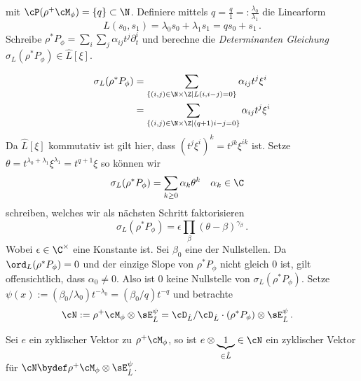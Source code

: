 mit $\cP(\rho^+\cM_\phi)=\{q\}\subset\N$. Definiere mittels
$q=\frac{q}{1}=:\frac{\lambda_0}{\lambda_1}$ die  Linearform
\[
L(s_0,s_1)=\lambda_0s_0+\lambda_1s_1=qs_0+s_1 \,.
\]
Schreibe $\rho^*P_{\phi}=\sum_i\sum_j\alpha_{ij}t^j\partial_t^i$ und berechne
die \emph{Determinanten Gleichung} $\sigma_L(\rho^*P_{\phi})\in \hat L[\xi]$.
\begin{comment}
Schon gezeigt, das $ord_L = 0$?
\end{comment}
\begin{align*}
\sigma_L(\rho^*P_{\phi})
  &= \sum_{\{(i,j)\in\N\times\Z \mid L(i,i-j)=0\}}\alpha_{ij}t^j\xi^i\\
  &= \sum_{\{(i,j)\in\N\times\Z \mid (q+1)i-j=0\}}\alpha_{ij}t^j\xi^i
\end{align*}
Da $\hat L[\xi]$ kommutativ ist gilt hier, dass $(t^j\xi^i)^k=t^{jk}\xi^{ik}$ ist.
Setze $\theta=t^{\lambda_0+\lambda_1}\xi^{\lambda_1}=t^{q+1}\xi$ so können wir
\begin{align*}
\sigma_L(\rho^*P_{\phi}) &= \sum_{k\geq 0}\alpha_k\theta^k & & \alpha_k\in\C
\end{align*}
schreiben, welches wir als nächsten Schritt faktorisieren
\[
\sigma_L(\rho^*P_\phi)=\epsilon\prod_{\beta}(\theta-\beta)^{\gamma_\beta}\,.
\]
Wobei $\epsilon\in\C^\times$ eine Konstante ist.
Sei $\beta_0$  eine der Nullstellen.
Da $\ord_L(\rho^*P_\phi)=0$ und der einzige Slope von $\rho^*P_\phi$ nicht
gleich $0$ ist, gilt offensichtlich, dass $\alpha_0\neq0$. Also ist $0$ keine
Nullstelle von $\sigma_L(\rho^*P_\phi)$.
Setze $\psi(x):=(\beta_0/\lambda_0)t^{-\lambda_0}=(\beta_0/q)t^{-q}$ und
betrachte
\begin{align*}
\cN:=\rho^+\cM_\phi\otimes\sE_{\hat L}^\psi
  &= \cD_{\hat L}/\cD_{\hat L}\cdot(\rho^*P_{\phi})\otimes\sE_{\hat L}^\psi \,.
\end{align*}
\begin{lem}
Sei $e$ ein zyklischer Vektor zu $\rho^+\cM_\phi$, so ist $e\otimes
\underset{\in\hat L}{\underbrace{1}}\in\cN$ ein zyklischer Vektor für
$\cN\bydef\rho^+\cM_\phi\otimes\sE_{\hat L}^\psi$.
\end{lem}
